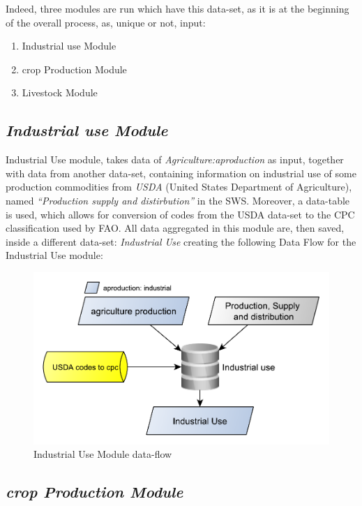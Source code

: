 \documentclass[]{article}
\providecommand{\tightlist}{%
  \setlength{\itemsep}{0pt}\setlength{\parskip}{0pt}}
\begin{document}
Indeed, three modules are run which have this data-set, as it is at the
beginning of the overall process, as, unique or not, input:

\begin{enumerate}
\def\labelenumi{\arabic{enumi}.}
\tightlist
\item
  Industrial use Module
\item
  crop Production Module
\item
  Livestock Module
\end{enumerate}

\subsection{\texorpdfstring{\emph{Industrial use
Module}}{Industrial use Module}}\label{industrial-use-module}

Industrial Use module, takes data of \emph{Agriculture:aproduction} as
input, together with data from another data-set, containing information
on industrial use of some production commodities from \emph{USDA}
(United States Department of Agriculture), named \emph{``Production
supply and distirbution''} in the SWS. Moreover, a data-table is used,
which allows for conversion of codes from the USDA data-set to the CPC
classification used by FAO. All data aggregated in this module are, then
saved, inside a different data-set: \emph{Industrial Use} creating the
following Data Flow for the Industrial Use module:

\begin{figure}[H]

{\centering \includegraphics[width=0.55\linewidth]{images/SwsFbs/05_industrialModule} 

}

\caption{\label{fig:f5}Industrial Use Module data-flow}\label{fig:f5}
\end{figure}

\subsection{\texorpdfstring{\emph{crop Production
Module}}{crop Production Module}}\label{crop-production-module}
\end{document}
